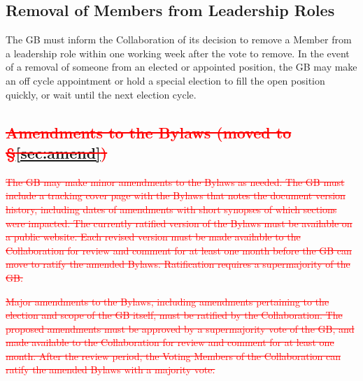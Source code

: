 \documentclass[12pt]{article}
\begin{document}
 \subsection{Removal of Members  from Leadership Roles}
 The GB must inform the Collaboration of its decision to remove a Member from a leadership role within one working week after the vote to remove.  In the event of a removal of someone from an elected or appointed position, the GB may make an off cycle appointment or hold a special election to fill the open position quickly, or wait until the next election cycle.  
 
 
\subsection{\textcolor{red} {\sout{Amendments to the Bylaws (moved to \S\ref{sec:amend})}}}
\textcolor{red} {\sout{
\label{subsec:amend}
The GB may make minor amendments to the Bylaws as needed.   The GB must  include a tracking cover page with the Bylaws that notes the document version history, including dates of amendments with short synopses of which sections were impacted.  The currently ratified version of the Bylaws must be available on a public website.  Each revised version must be made available to the Collaboration for review and comment for at least one month before the GB can move to ratify the amended Bylaws.  Ratification requires a supermajority of the GB.}}

\textcolor{red} {\sout{
Major amendments to the Bylaws, including amendments pertaining to the election and scope of the GB itself,  must be ratified by the Collaboration.  The proposed amendments must be approved by a supermajority vote of the GB, and made available to the Collaboration for review and comment for at least one month.  After the review period, the Voting Members of the Collaboration can  ratify the amended Bylaws with a majority vote. }}



\end{document}
